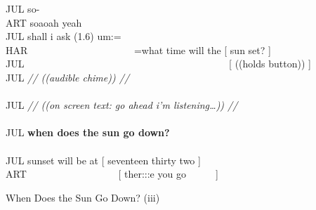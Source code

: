 \begin{revisedsubmission}
\begin{inlinefrag}
    {
    \begin{transcript}[32]
        \by JUL {so-} \\
        \by ART {soaoah yeah\intUp} \\
        \by JUL {shall i ask (1.6) um:=} \\
        \by HAR {~~~~~~~~~~~~~~~~~~~~~=what time will the [ sun set? ]} \\
        \by JUL {~~~~~~~~~~~~~~~~~~~~~~~~~~~~~~~~~~~~~~~~~[ ((holds button)) ]} \\
        \by JUL {\textit{// ((audible chime)) //}} \\
         \\
        \by JUL {\textit{ // ((on screen text: go ahead i’m listening\ldots)) //}} \\
         \\
        \by JUL {\textbf{when does the sun go down?}} \\
         \\
        \by JUL {sunset will be at [ seventeen thirty two ]} \\
        \by ART {~~~~~~~~~~~~~~~~~~[ ther:::e you go~~~~~~]} \\
    \end{transcript}
    \caption{When Does the Sun Go Down? (iii)}\label{frag:empirical cafe findings newinfo-iii}
    }
\end{inlinefrag}


\end{revisedsubmission}

